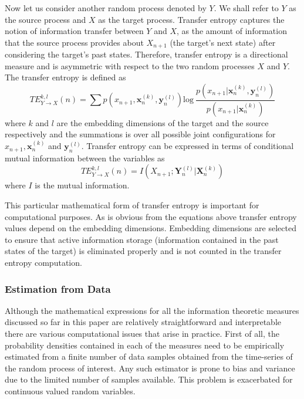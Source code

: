 \documentclass[12pt]{article}
\begin{document}
Now let us consider another random process denoted by $Y$. We shall refer to $Y$ as the source process and $X$ as the target process. Transfer entropy captures the notion of information transfer between $Y$ and $X$, as the amount of information that the source process provides about $X_{n+1}$ (the target's next state) after considering the target's past states. Therefore, transfer entropy is a directional measure and is asymmetric with respect to the two random processes $X$ and $Y$. The transfer entropy is defined as 
\begin{equation*}
TE_{Y \rightarrow X}^{k, l}(n) = \sum_{}^{}p(x_{n+1}, \boldsymbol{x}_n^{(k)}, \boldsymbol{y}_n^{(l)})\text{log}~\frac{p(x_{n+1} | \boldsymbol{x}_n^{(k)}, \boldsymbol{y}_n^{(l)})}{p(x_{n+1}|\boldsymbol{x}_n^{(k)})}
\end{equation*}
where $k$ and $l$ are the embedding dimensions of the target and the source respectively and the summations is over all possible joint configurations for $x_{n+1}, \boldsymbol{x}_n^{(k)}$ and $\boldsymbol{y}_n^{(l)}$. 
Transfer entropy can be expressed in terms of conditional mutual information between the variables as
\begin{equation}\label{eq:te}
TE_{Y \rightarrow X}^{k,l}(n) = I(X_{n+1}; \boldsymbol{Y}_n^{(l)}|\boldsymbol{X}_n^{(k)})
\end{equation}
where $I$ is the mutual information. 

This particular mathematical form of transfer entropy is important for computational purposes. As is obvious from the equations above transfer entropy values depend on the embedding dimensions. Embedding dimensions are selected to ensure that active information storage (information contained in the past states of the target) is eliminated properly and is not counted in the transfer entropy computation. 

\subsubsection{Estimation from Data}

Although the mathematical expressions for all the information theoretic measures discussed so far in this paper are relatively straightforward and interpretable there are various computational issues that arise in practice. First of all, the probability densities contained in each of the measures need to be empirically estimated from a finite number of data samples obtained from the time-series of the random process of interest. Any such estimator is prone to bias and variance due to the limited number of samples available. This problem is exacerbated for continuous valued random variables.
\end{document}
